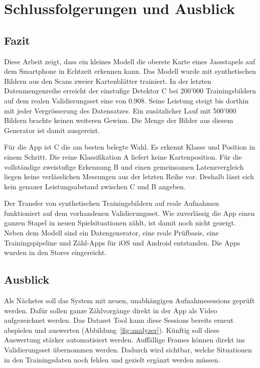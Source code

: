 \section{Schlussfolgerungen und Ausblick}\label{sec:schluss}

\subsection{Fazit}\label{sec:fazit}

Diese Arbeit zeigt, dass ein kleines Modell die oberste Karte eines
Jassstapels auf dem Smartphone in Echtzeit erkennen kann. Das Modell
wurde mit synthetischen Bildern aus den Scans zweier Kartenblätter
trainiert. In der letzten Datenmengenreihe erreicht der einstufige
Detektor C bei 200'000 Trainingsbildern auf dem realen
Validierungsset eine  von 0.908. Seine Leistung steigt bis
dorthin mit jeder Vergrösserung des Datensatzes. Ein zusätzlicher Lauf
mit 500'000 Bildern brachte keinen weiteren Gewinn. Die Menge der Bilder
aus diesem Generator ist damit ausgereizt.

Für die App ist C die am besten belegte Wahl. Es erkennt Klasse und
Position in einem Schritt. Die reine Klassifikation A liefert keine
Kartenposition. Für die vollständige zweistufige Erkennung B und
einen gemeinsamen Latenzvergleich liegen keine verlässlichen
Messungen aus der letzten Reihe vor. Deshalb lässt sich kein genauer
Leistungsabstand zwischen C und B angeben.

Der Transfer von synthetischen Trainingsbildern auf reale Aufnahmen
funktioniert auf dem vorhandenen Validierungsset. Wie zuverlässig
die App einen ganzen Stapel in neuen Spielsituationen zählt, ist
damit noch nicht gezeigt. Neben dem Modell sind ein Datengenerator,
eine reale Prüfbasis, eine Trainingspipeline und Zähl-Apps für iOS
und Android entstanden. Die Apps wurden in den Stores eingereicht.

\subsection{Ausblick}\label{sec:ausblick}

Als Nächstes soll das System mit neuen, unabhängigen Aufnahmesessions
geprüft werden. Dafür sollen ganze Zählvorgänge direkt in der App als
Video aufgezeichnet werden. Das Dataset Tool kann diese Sessions bereits
erneut abspielen und auswerten (Abbildung~\ref{fig:analyzer}). Künftig
soll diese Auswertung stärker automatisiert werden. Auffällige Frames
können direkt ins Validierungsset übernommen werden. Dadurch wird
sichtbar, welche Situationen in den Trainingsdaten noch fehlen und
gezielt ergänzt werden müssen.

